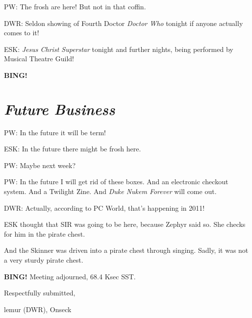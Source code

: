 \documentclass[10pt]{article}
\newcommand{\bing}{{\bf BING!} }
\newcommand{\goto}[1]{\bing \vskip 12pt \section*{{\em{#1}}}}
\newcommand{\onseck}{lemur (DWR), Onseck}
\begin{document}
PW: The frosh are here!  But not in that coffin.

DWR: Seldon showing of Fourth Doctor \emph{Doctor Who} tonight if anyone
actually comes to it!

ESK: \emph{Jesus Christ Superstar} tonight and further nights, being 
performed by Musical Theatre Guild!

\goto{Future Business}

PW: In the future it will be term!

ESK: In the future there might be frosh here.

PW: Maybe next week?

PW: In the future I will get rid of these boxes.  And an electronic
checkout system.  And a Twilight Zine.  And \emph{Duke Nukem Forever}
will come out.

DWR: Actually, according to PC World, that's happening in 2011!

ESK thought that SIR was going to be here, because Zephyr said so.
She checks for him in the pirate chest.

And the Skinner was driven into a pirate chest through singing.
Sadly, it was not a very sturdy pirate chest.

\bing
\noindent
Meeting adjourned, 68.4 Ksec SST.

\vspace{18pt}

\centerline{Respectfully submitted,}
\centerline{\onseck}
\end{document}
